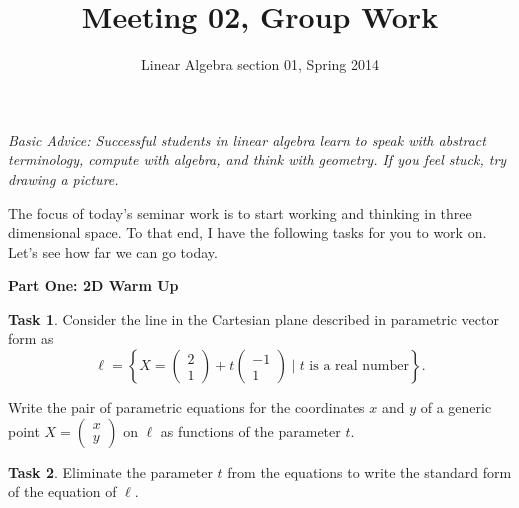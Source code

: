 \documentclass[11pt]{amsart}
\theoremstyle{definition}
\newtheorem{task}{Task}
\begin{document}
\title{Meeting 02, Group Work}
\author{Linear Algebra section 01, Spring 2014}

\maketitle

\emph{Basic Advice: Successful students in linear algebra learn to speak with abstract terminology, compute with algebra, and think with geometry. If you feel stuck, try drawing a picture.}

\vspace{1cm}

The focus of today's seminar work is to start working and thinking in three dimensional space. To that end, I have the following tasks for you to work on. Let's see how far we can go today.

\vspace{.5cm}

\begin{center}\textbf{Part One: 2D Warm Up}\end{center}

\begin{task}
Consider the line in the Cartesian plane described in parametric vector form as
\[
\ell = \left\{ X = \left(\begin{smallmatrix} 2 \\ 1 \end{smallmatrix}\right)
+ t \left( \begin{smallmatrix} -1 \\ 1 \end{smallmatrix} \right) \mid \text{$t$ is a real number}\right\}.
\]

Write the pair of parametric equations for the coordinates $x$ and $y$ of a generic point $X = \left( \begin{smallmatrix} x \\ y \end{smallmatrix}\right)$ on $\ell$ as functions of the parameter $t$.
\end{task}

\vspace{1.5in}

\begin{task}
Eliminate the parameter $t$ from the equations to write the standard form of the equation of $\ell$.
\end{task}

\vfill

\clearpage
\end{document}
